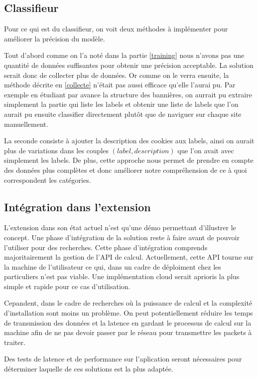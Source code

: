 \documentclass[oneside,a4paper,12pt]{article}
\begin{document}
	\subsection{Classifieur}
	Pour ce qui est du classifieur, on voit deux méthodes à implémenter pour améliorer la précision du modèle.
	
	Tout d'abord comme on l'a noté dans la partie \ref{training} nous n'avons pas une quantité de données suffisantes pour obtenir une précision acceptable. La solution serait donc de collecter plus de données. Or comme on le verra ensuite, la méthode décrite en \ref{collecte} n'était pas aussi efficace qu'elle l'aurai pu. Par exemple en étudiant par avance la structure des bannières, on aurrait pu extraire simplement la partie qui liste les labels et obtenir une liste de labels que l'on aurait pu ensuite classifier directement plutôt que de naviguer sur chaque site manuellement.
	
	La seconde consiste à ajouter la description des cookies aux labels, ainsi on aurait plus de variations dans les couples $(label, description)$ que l'on avait avec simplement les labels.
	De plus, cette approche nous permet de prendre en compte des données plus complètes et donc améliorer notre compréhension de ce à quoi correspondent les catégories.
	
	\subsection{Intégration dans l'extension}
	
	L'extension dans son état actuel n'est qu'une démo permettant d'illustrer le concept. Une phase d'intégration de la solution reste à faire avant de pouvoir l'utiliser pour des recherches.
	Cette phase d'intégration comprends majoritairement la gestion de l'API de calcul.
	Actuellement, cette API tourne sur la machine de l'utilisateur ce qui, dans un cadre de déploiment chez les particuliers n'est pas viable. Une implémentation cloud serait aprioris la plus simple et rapide pour ce cas d'utilisation.
	
	Cepandent, dans le cadre de recherches où la puissance de calcul et la complexité d'installation sont moins un problème. On peut potentiellement réduire les temps de transmission des données et la latence en gardant le processus de calcul sur la machine afin de ne pas devoir passer par le réseau pour transmettre les packets à traiter.
	
	Des tests de latence et de performance sur l'aplication seront nécessaires pour déterminer laquelle de ces solutions est la plus adaptée.
		
\end{document}
